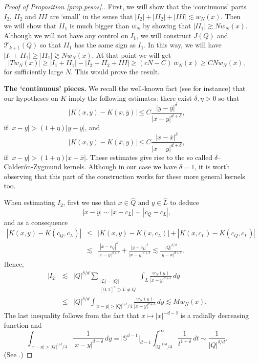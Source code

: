 \documentclass[11pt]{amsart}
\theoremstyle{definition}
\begin{document}
\begin{proof}[Proof of Proposition \ref{prop.pesos}.]
\bigskip

First, we will show that the `continuous' parts $I_2$, $I\!I_2$ and $I\!I\!I$ are `small' in the sense that $|I_2|+|I\!I_2|+|I\!I\!I|\lesssim w_N(x)$. Then we will show that $I\!I_1$ is much bigger than $w_N$ by showing that $|I\!I_1|\gtrsim N w_N(x)$. Although we will not have any control on $I_1$, we will  construct $J(Q)$ and ${\mathcal T_{k+1}}(Q)$ so that $I\!I_1$ has the same sign as $I_1$. In this way, we will have 
 $|I_1+I\!I_1|\geq |I\!I_1| \gtrsim N w_N(x)$. At that point we will get
\[
|T w_N(x)| \geq |I_1+I\!I_1| - |I_2+I\!I_2+I\!I\!I| \geq (cN-C)\ w_N(x)\geq CN w_N(x),
\]
for sufficiently large $N$. This would prove the result.

\bigskip

\textbf{The `continuous' pieces.} We recall the well-known fact (see \cite{Stein} for instance) that our hypotheses on $K$ imply the following estimates: there exist $\delta, \eta>0$ so that
\begin{equation}\label{CZy}
|K(x,y)-K(x,\bar y)|\leq C\frac{|y-\bar y|^\delta}{|x-y|^{d+\delta}},
\end{equation}
if $|x-y|>(1+\eta)|y-\bar y|$, and 
\begin{equation}\label{CZx}
|K(x,y)-K(\bar x,y)|\leq C\frac{|x-\bar x|^\delta}{|x-y|^{d+\delta}},
\end{equation}
if $|x-y|>(1+\eta)|x-\bar x|$. These estimates give rise to the so called $\delta$--Calder\'on-Zygmund kernels. Although in our case we have $\delta=1$, it is worth observing that this part of the construction works for these more general kernels too. 

\bigskip

When estimating $I_2$, first we use that $x\in \widehat{Q}$ and $y\in \widehat{L}$ to deduce
\[
|x-y|\sim |x-c_L|\sim |c_Q-c_L|,
\]
and as a consequence
\begin{eqnarray}\label{tamanyo.nucleo}
|K(x,y)-K(c_Q,c_L)|&\leq& |K(x,y)-K(x,c_L)|+|K(x,c_L)-K(c_Q,c_L)| \nonumber\\&\lesssim& \frac{|x-c_Q|^\delta}{|x-y|^{d+\delta}}+\frac{|y-c_L|^\delta}{|x-y|^{d+\delta}}\lesssim \frac{|Q|^{\delta/d}}{|y-x|^{d+\delta}}.
\end{eqnarray}
Hence,
\begin{eqnarray*}
|I_2|&\lesssim & |Q|^{\delta/d} \sum_{\begin{array}{c}\\[-6mm]\scriptstyle{|L|=|Q|}\\[-1.5mm] \scriptstyle{[0,1]^n\supset L\neq Q}\end{array}} \int_L \frac{w_N(y)}{|x-y|^{d+\delta}}\,dy\\&\leq& |Q|^{\delta/d} \int_{|x-y|>|Q|^{1/\delta}/4} \frac{w_N(y)}{|x-y|^{d+\delta}}\,dy \lesssim Mw_N(x).
\end{eqnarray*}
The last inequality follows from the fact that  $x\mapsto |x|^{-d-\delta}$ is a radially decreasing function and
\[
\int_{|x-y|>|Q|^{1/\delta}/4} \frac{1}{|x-y|^{d+\delta}}\,dy = \bigl|\mathbb S^{d-1}\bigr|_{d-1} \int_{|Q|^{1/d}/4}^\infty \frac{1}{t^{1+\delta}}\,dt \sim \frac{1}{|Q|^{\delta/d}}.
\]
(See \cite{Stein}.)
\bigskip


\end{proof}
\end{document}
